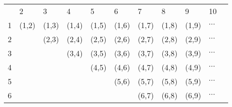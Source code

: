 \begin{table}[!htb]
	\centering
	\begin{tabular}{lllllllllll}
		& 2                             & 3                             & 4                            & 5                             & 6                             & 7                             & 8                             & 9                             & 10                                &  \\
		1 & \cellcolor[HTML]{9B9B9B}(1,2) & \cellcolor[HTML]{9B9B9B}(1,3) & \cellcolor[HTML]{C0C0C0}(1,4) & \cellcolor[HTML]{C0C0C0}(1,5) & \cellcolor[HTML]{9B9B9B}(1,6) & \cellcolor[HTML]{9B9B9B}(1,7) & \cellcolor[HTML]{9B9B9B}(1,8) & \cellcolor[HTML]{C0C0C0}(1,9) & \cellcolor[HTML]{C0C0C0}$\cdots$ &  \\
		2 &                               & \cellcolor[HTML]{9B9B9B}(2,3) & \cellcolor[HTML]{C0C0C0}(2,4) & \cellcolor[HTML]{C0C0C0}(2,5) & \cellcolor[HTML]{9B9B9B}(2,6) & \cellcolor[HTML]{9B9B9B}(2,7) & \cellcolor[HTML]{9B9B9B}(2,8) & \cellcolor[HTML]{C0C0C0}(2,9) & \cellcolor[HTML]{C0C0C0}$\cdots$ &  \\
		3 &                               &                               & \cellcolor[HTML]{C0C0C0}(3,4) & \cellcolor[HTML]{C0C0C0}(3,5) & \cellcolor[HTML]{9B9B9B}(3,6) & \cellcolor[HTML]{9B9B9B}(3,7) & \cellcolor[HTML]{9B9B9B}(3,8) & \cellcolor[HTML]{C0C0C0}(3,9) & \cellcolor[HTML]{C0C0C0}$\cdots$ &  \\
		4 &                               &                               &                               & (4,5)                         & \cellcolor[HTML]{C0C0C0}(4,6) & \cellcolor[HTML]{C0C0C0}(4,7) & \cellcolor[HTML]{C0C0C0}(4,8) & (4,9)                         & $\cdots$                         &  \\
		5 &                               &                               &                               &                               & \cellcolor[HTML]{C0C0C0}(5,6) & \cellcolor[HTML]{C0C0C0}(5,7) & \cellcolor[HTML]{C0C0C0}(5,8) & (5,9)                         & $\cdots$                         &  \\
		6 &                               &                               &                               &                               &                               & \cellcolor[HTML]{9B9B9B}(6,7) & \cellcolor[HTML]{9B9B9B}(6,8) & \cellcolor[HTML]{C0C0C0}(6,9) & \cellcolor[HTML]{C0C0C0}$\cdots$ &  \\

\end{tabular}
\end{table}
